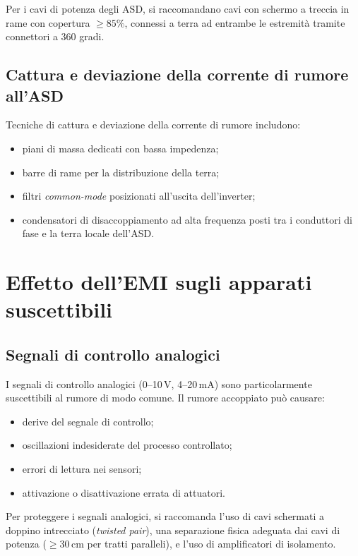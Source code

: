 Per i cavi di potenza degli ASD, si raccomandano cavi con schermo a treccia in rame con copertura $\ge 85\%$, connessi a terra ad entrambe le estremità tramite connettori a 360 gradi.

\subsection{Cattura e deviazione della corrente di rumore all'ASD}

Tecniche di cattura e deviazione della corrente di rumore includono:

\begin{itemize}
\item piani di massa dedicati con bassa impedenza;
\item barre di rame per la distribuzione della terra;
\item filtri \textit{common-mode} posizionati all'uscita dell'inverter;
\item condensatori di disaccoppiamento ad alta frequenza posti tra i conduttori di fase e la terra locale dell'ASD.
\end{itemize}

\section{Effetto dell'EMI sugli apparati suscettibili}

\subsection{Segnali di controllo analogici}

I segnali di controllo analogici (0--10\,V, 4--20\,mA) sono particolarmente suscettibili al rumore di modo comune. Il rumore accoppiato può causare:

\begin{itemize}
\item derive del segnale di controllo;
\item oscillazioni indesiderate del processo controllato;
\item errori di lettura nei sensori;
\item attivazione o disattivazione errata di attuatori.
\end{itemize}

Per proteggere i segnali analogici, si raccomanda l'uso di cavi schermati a doppino intrecciato (\textit{twisted pair}), una separazione fisica adeguata dai cavi di potenza ($\ge 30$\,cm per tratti paralleli), e l'uso di amplificatori di isolamento.

